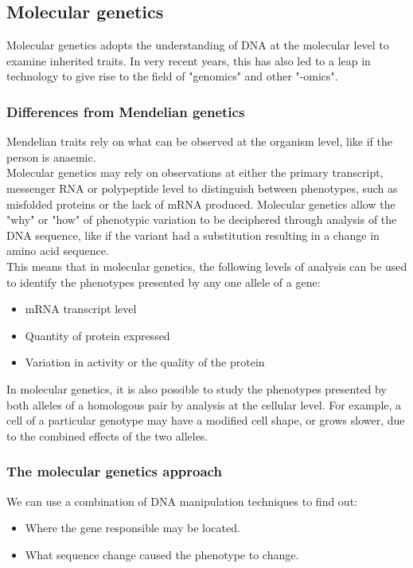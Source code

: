 \documentclass[11pt]{article}
\begin{document}
\subsection{Molecular genetics}
\label{sec:org17b4b00}
Molecular genetics adopts the understanding of DNA at the molecular level to examine inherited traits. In very recent years, this has also led to a leap in technology to give rise to the field of "genomics" and other "-omics".

\subsubsection{Differences from Mendelian genetics}
\label{sec:orga310914}
Mendelian traits rely on what can be observed at the organism level, like if the person is anaemic.
\\[0pt]

Molecular genetics may rely on observations at either the primary transcript, messenger RNA or polypeptide level to distinguish between phenotypes, such as misfolded proteins or the lack of mRNA produced. Molecular genetics allow the "why" or "how" of phenotypic variation to be deciphered through analysis of the DNA sequence, like if the variant had a substitution resulting in a change in amino acid sequence.
\\[0pt]

This means that in molecular genetics, the following levels of analysis can be used to identify the phenotypes presented by any one allele of a gene:
\begin{itemize}
\item mRNA transcript level
\item Quantity of protein expressed
\item Variation in activity or the quality of the protein
\end{itemize}

In molecular genetics, it is also possible to study the phenotypes presented by both alleles of a homologous pair by analysis at the cellular level. For example, a cell of a particular genotype may have a modified cell shape, or grows slower, due to the combined effects of the two alleles.

\newpage

\subsubsection{The molecular genetics approach}
\label{sec:orgf613208}
We can use a combination of DNA manipulation techniques to find out:
\begin{itemize}
\item Where the gene responsible may be located.
\item What sequence change caused the phenotype to change.
\end{itemize}
\end{document}
